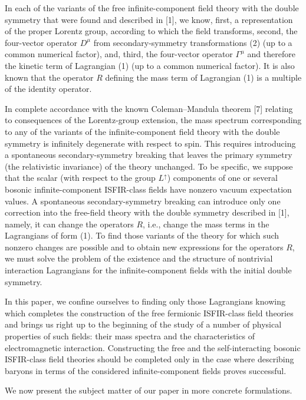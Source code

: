 \documentclass[a4paper,12pt]{article}
\begin{document}
In each of the variants of the free infinite-component field theory with the
double symmetry that were found and described in [1], we know, first, a
representation of the proper Lorentz group, according to which the field
transforms, second, the four-vector operator $D^{\mu}$ from secondary-symmetry
transformations (2) (up to a common numerical factor), and, third, the
four-vector operator $\Gamma^{\mu}$ and therefore the kinetic term of
Lagrangian (1) (up to a common numerical factor). It is also known that the
operator $R$ defining the mass term of Lagrangian (1) is a multiple of the
identity operator.

In complete accordance with the known Coleman--Mandula theorem [7] relating to
consequences of the Lorentz-group extension, the mass spectrum corresponding
to any of the variants of the infinite-component field theory with the double
symmetry is infinitely degenerate with respect to spin. This requires
introducing a spontaneous secondary-symmetry breaking that leaves the primary
symmetry (the relativistic invariance) of the theory unchanged. To be specific,
we suppose that the scalar (with respect to the group $L^{\uparrow}$)
components of one or several bosonic infinite-component ISFIR-class fields have
nonzero vacuum expectation values. A spontaneous secondary-symmetry breaking 
can introduce only one correction into the free-field theory with the double 
symmetry described in [1], namely, it can change the operators $R$, i.e.,
change the mass terms in the Lagrangians of form (1). To find those variants of
the theory for which such nonzero changes are possible and to obtain new
expressions for the operators $R$, we must solve the problem of the existence
and the structure of nontrivial interaction Lagrangians for the
infinite-component fields with the initial double symmetry.

In this paper, we confine ourselves to finding only those Lagrangians knowing
which completes the construction of the free fermionic ISFIR-class field
theories and brings us right up to the beginning of the study of a number of
physical properties of such fields: their mass spectra and the characteristics
of electromagnetic interaction. Constructing the free and the self-interacting
bosonic ISFIR-class field theories should be completed only in the case where
describing baryons in terms of the considered infinite-component fields proves
successful.

We now present the subject matter of our paper in more concrete formulations.
\end{document}
